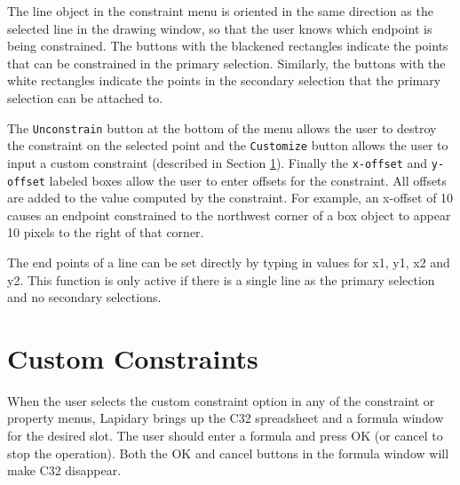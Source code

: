 The line object in the constraint menu is oriented in the same direction
as the selected line in the
drawing window, so that the user knows which endpoint is being constrained.
The buttons with the blackened rectangles indicate the points that can be
constrained in the primary selection.
Similarly, the buttons with the white rectangles indicate the points in the
secondary selection that
the primary selection can be attached to.

The {\tt Unconstrain} button at the bottom of the menu allows the user to
destroy the constraint on the selected point and the {\tt Customize} button
allows the user to input a custom constraint (described in Section
\ref{custom-constraint}). Finally the {\tt x-offset} and {\tt y-offset} labeled
boxes allow the user to enter offsets for the constraint.
All offsets are added to the value computed by the constraint.
For example, an x-offset of 10 causes an endpoint constrained to the northwest
corner of a box object to appear 10 pixels to the right of that corner.

The end points of a line can be set directly by typing in values for
x1, y1, x2 and y2.  This function is only active if there is a single line as
the primary selection and no secondary selections.

\section{Custom Constraints}
\label{custom-constraint}

When the user selects the custom constraint option in any of the constraint or
property menus, Lapidary brings up the C32 spreadsheet and a formula window
for the desired slot. The user should enter a formula and press OK (or
cancel to stop the operation). Both the OK and cancel buttons in the formula
window will make C32 disappear.

